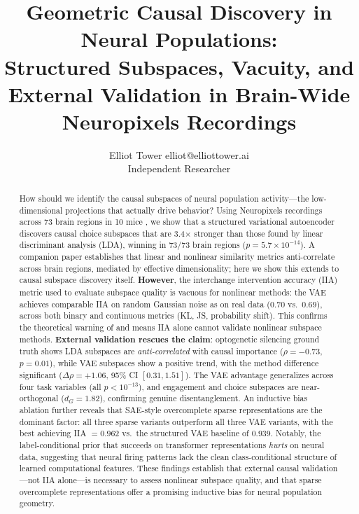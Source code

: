 \documentclass{article}
\title{Geometric Causal Discovery in Neural Populations: \\
Structured Subspaces, Vacuity, and External Validation in Brain-Wide Neuropixels Recordings}
\author{\name Elliot Tower \email elliot@elliottower.ai \\
      \addr Independent Researcher}
\begin{document}
\maketitle

\begin{abstract}
How should we identify the causal subspaces of neural population activity---the low-dimensional projections that actually drive behavior? Using Neuropixels recordings across 73 brain regions in 10 mice \citep{steinmetz2019distributed}, we show that a structured variational autoencoder discovers causal choice subspaces that are 3.4$\times$ stronger than those found by linear discriminant analysis (LDA), winning in 73/73 brain regions ($p = 5.7 \times 10^{-14}$). A companion paper establishes that linear and nonlinear similarity metrics anti-correlate across brain regions, mediated by effective dimensionality; here we show this extends to causal subspace discovery itself. \textbf{However}, the interchange intervention accuracy (IIA) metric used to evaluate subspace quality is vacuous for nonlinear methods: the VAE achieves comparable IIA on random Gaussian noise as on real data ($0.70$ vs.\ $0.69$), across both binary and continuous metrics (KL, JS, probability shift). This confirms the theoretical warning of \citet{sutter2025iia} and means IIA alone cannot validate nonlinear subspace methods. \textbf{External validation rescues the claim}: optogenetic silencing ground truth \citep{zatkahaas2021spatiotemporal} shows LDA subspaces are \emph{anti-correlated} with causal importance ($\rho = -0.73$, $p = 0.01$), while VAE subspaces show a positive trend, with the method difference significant ($\Delta\rho = +1.06$, 95\% CI $[0.31, 1.51]$). The VAE advantage generalizes across four task variables (all $p < 10^{-13}$), and engagement and choice subspaces are near-orthogonal ($d_G = 1.82$), confirming genuine disentanglement. An inductive bias ablation further reveals that SAE-style overcomplete sparse representations are the dominant factor: all three sparse variants outperform all three VAE variants, with the best achieving IIA $= 0.962$ vs.\ the structured VAE baseline of $0.939$. Notably, the label-conditional prior that succeeds on transformer representations \citep{zhou2020pivae} \emph{hurts} on neural data, suggesting that neural firing patterns lack the clean class-conditional structure of learned computational features. These findings establish that external causal validation---not IIA alone---is necessary to assess nonlinear subspace quality, and that sparse overcomplete representations offer a promising inductive bias for neural population geometry.
\end{abstract}
\end{document}
